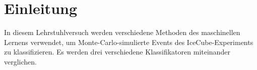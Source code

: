 \section{Einleitung}
In diesem Lehrstuhlversuch werden verschiedene Methoden des maschinellen Lernens verwendet, um Monte-Carlo-simulierte Events des IceCube-Experiments zu klassifizieren. Es werden drei verschiedene Klassifikatoren miteinander verglichen. 
